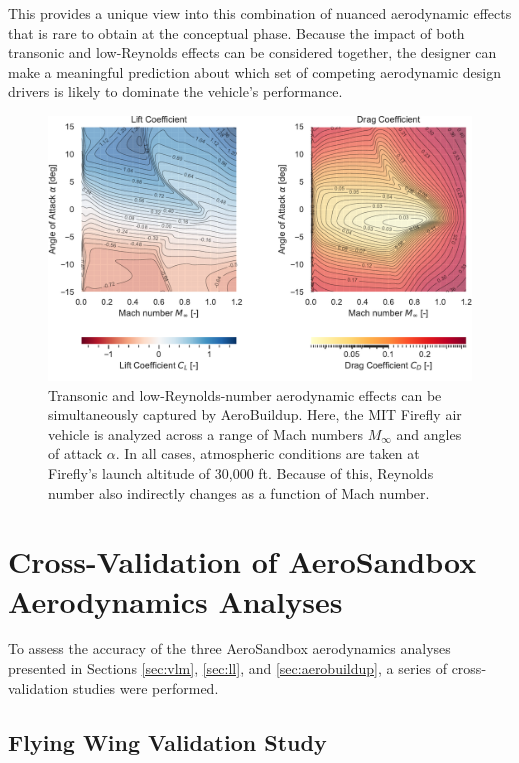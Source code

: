 \noindent This provides a unique view into this combination of nuanced aerodynamic effects that is rare to obtain at the conceptual phase. Because the impact of both transonic and low-Reynolds effects can be considered together, the designer can make a meaningful prediction about which set of competing aerodynamic design drivers is likely to dominate the vehicle's performance.

\begin{figure}[!htb]
    \centering
    \includegraphics[width=\textwidth]{../figures/aerobuildup_figs/transonic.pdf}
    \caption{Transonic and low-Reynolds-number aerodynamic effects can be simultaneously captured by AeroBuildup. Here, the MIT Firefly air vehicle is analyzed across a range of Mach numbers $M_\infty$ and angles of attack $\alpha$. In all cases, atmospheric conditions are taken at Firefly's launch altitude of 30,000 ft. Because of this, Reynolds number also indirectly changes as a function of Mach number.}
    \label{fig:ab_transonic}
\end{figure}




\section{Cross-Validation of AeroSandbox Aerodynamics Analyses}
\label{sec:aero_validation}

To assess the accuracy of the three AeroSandbox aerodynamics analyses presented in Sections \ref{sec:vlm}, \ref{sec:ll}, and \ref{sec:aerobuildup}, a series of cross-validation studies were performed.

\subsection{Flying Wing Validation Study}

